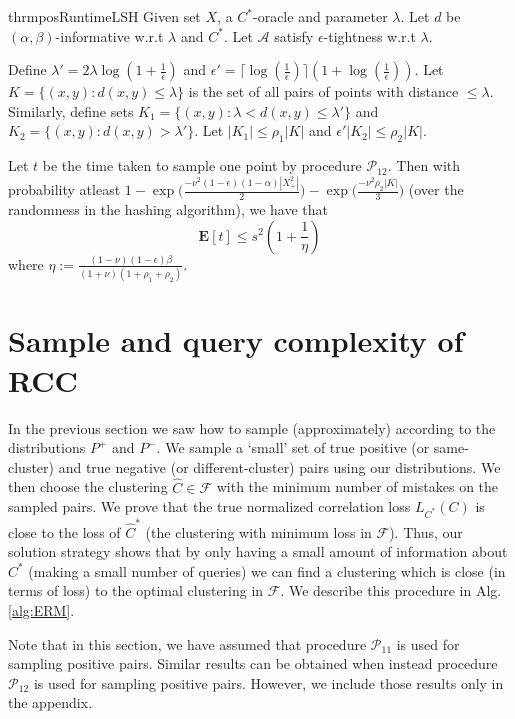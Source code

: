\documentclass[12pt]{article}
\newcommand{\mb}{\mathbf}
\newcommand{\mc}{\mathcal}
\begin{document}
\begin{restatable}{thrm}{posRuntimeLSH}
\label{thm:posRuntimeLSH}
Given set $X$, a $C^*$-oracle and parameter $\lambda$. Let $d$ be $(\alpha, \beta)$-informative w.r.t $\lambda$ and $C^*$. Let $\mc A$ satisfy $\epsilon$-tightness w.r.t $\lambda$. 

Define $\lambda' = 2\lambda\log(1+\frac{1}{\epsilon})$ and $\epsilon' = \lceil \log(\frac{1}{\epsilon})\rceil (1+\log(\frac{1}{\epsilon}))$. Let $K = \{(x, y) : d(x, y) \le \lambda\}$ is the set of all pairs of points with distance $\le \lambda$. Similarly, define sets $K_1 = \{(x, y): \lambda < d(x, y) \le \lambda'\}$ and $K_2 = \{(x, y): d(x, y) > \lambda'\}$. Let $|K_1| \le \rho_1|K|$ and $\epsilon'|K_2| \le \rho_2|K|$. 

Let $t$ be the time taken to sample one point by procedure $\mc P_{12}$. Then with probability atleast $1- \exp\Big(\frac{-\nu^2(1-\epsilon)(1-\alpha)|X^2_+|}{2}\Big)- \exp\Big(\frac{-\nu^2\rho_2 |K|}{3}\Big)$ (over the randomness in the hashing algorithm), we have that $$\mb E[t] \le s^2(1+\frac{1}{\eta})$$
where $\eta := \frac{(1-\nu)(1-\epsilon)\beta}{(1+\nu)(1+\rho_1+\rho_2)}$. 
\end{restatable}


\section{Sample and query complexity of RCC}
\label{section:sampleAndQueryComplexity}
In the previous section we saw how to sample (approximately) according to the distributions $P^+$ and $P^-$. We sample a `small' set of true positive (or same-cluster) and true negative (or different-cluster) pairs using our distributions. We then choose the clustering $\hat C \in \mc F$ with the minimum number of mistakes on the sampled pairs. We prove that the true normalized correlation loss $L_{C^*}(C)$ is close to the loss of $\hat C^*$ (the clustering with minimum loss in $\mc F$). Thus, our solution strategy shows that by only having a small amount of information about $C^*$ (making a small number of queries) we can find a clustering which is close (in terms of loss) to the optimal clustering in $\mc F$. We describe this procedure in Alg. \ref{alg:ERM}. 

Note that in this section, we have assumed that procedure $\mc P_{11}$ is used for sampling positive pairs. Similar results can be obtained when instead procedure $\mc P_{12}$ is used for sampling positive pairs. However, we include those results only in the appendix. 
\end{document}
